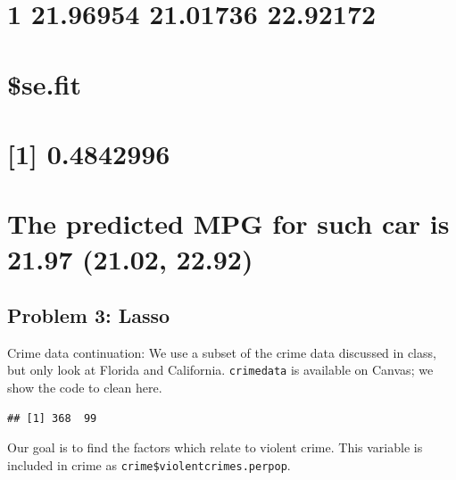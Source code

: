 \documentclass[]{article}
\newenvironment{Shaded}{\begin{snugshade}}{\end{snugshade}}
\newcommand{\KeywordTok}[1]{\textcolor[rgb]{0.13,0.29,0.53}{\textbf{#1}}}
\newcommand{\DataTypeTok}[1]{\textcolor[rgb]{0.13,0.29,0.53}{#1}}
\newcommand{\StringTok}[1]{\textcolor[rgb]{0.31,0.60,0.02}{#1}}
\newcommand{\OperatorTok}[1]{\textcolor[rgb]{0.81,0.36,0.00}{\textbf{#1}}}
\newcommand{\NormalTok}[1]{#1}
\begin{document}
\section{1 21.96954 21.01736 22.92172}\label{section}

\section{\$se.fit}\label{se.fit}

\section{{[}1{]} 0.4842996}\label{section-1}

\section{The predicted MPG for such car is 21.97 (21.02,
22.92)}\label{the-predicted-mpg-for-such-car-is-21.97-21.02-22.92}

\subsection{Problem 3: Lasso}\label{problem-3-lasso}

Crime data continuation: We use a subset of the crime data discussed in
class, but only look at Florida and California. \texttt{crimedata} is
available on Canvas; we show the code to clean here.

\begin{Shaded}
\end{Shaded}

\begin{verbatim}
## [1] 368  99
\end{verbatim}

Our goal is to find the factors which relate to violent crime. This
variable is included in crime as \texttt{crime\$violentcrimes.perpop}.
\end{document}
